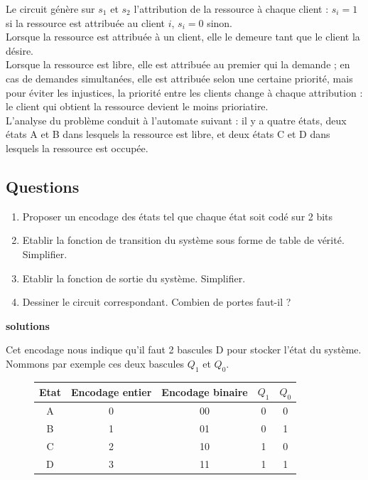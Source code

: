 \documentclass[a4paper,11pt]{article}
\begin{document}
Le circuit génère sur $s_1$ et $s_2$ l'attribution de la ressource à chaque client : $s_i=1$ si la ressource est attribuée au client $i$, $s_i=0$ sinon.\\

Lorsque la ressource est attribuée à un client, elle le demeure tant que le client la désire.\\

Lorsque la ressource est libre, elle est attribuée au premier qui la demande ; en cas de demandes simultanées, elle est attribuée selon une certaine priorité, mais pour éviter les injustices, la priorité entre les clients change à chaque attribution : le client qui obtient la ressource devient le moins prioriatire.\\

L'analyse du problème conduit à l'automate suivant : il y a quatre états, deux états A et B dans lesquels la ressource est libre, et deux états C et D dans lesquels la ressource est occupée.

\subsection*{Questions}
\begin{enumerate}
\item Proposer un encodage des états tel que chaque état soit codé sur 2 bits
\item Etablir la fonction de transition du système sous forme de table de vérité. Simplifier.
\item Etablir la fonction de sortie du système. Simplifier.
\item Dessiner le circuit correspondant. Combien de portes faut-il ?
\end{enumerate}

\newpage
{\bf solutions}

Cet encodage nous indique qu'il faut 2 bascules D pour stocker l'état du système. Nommons par exemple ces deux bascules $Q_1$ et $Q_0$.

\begin{figure}
\begin{center}

      \begin{tabular}{|c||c|c|cc|}
          \hline
          Etat  & Encodage entier & Encodage binaire & $Q_1$ & $Q_0$ \\ \hline \hline
          A     & 0 & 00 & 0 & 0 \\ \hline
          B     & 1 & 01 & 0 & 1 \\ \hline
          C     & 2 & 10 & 1 & 0 \\ \hline
          D     & 3 & 11 & 1 & 1 \\ \hline
      \end{tabular}
\end{center}
\end{figure}
\end{document}
